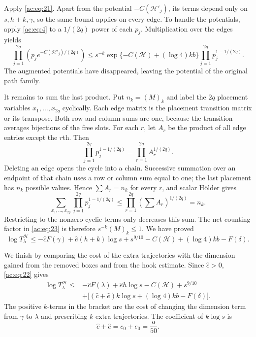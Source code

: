 Apply \eqref{ac:eq:21}. Apart from the potential
\(-C(\mathcal H'_j)\), its terms depend only on \(s,h+k,\gamma\), so the
same bound applies on every edge. To handle the potentials, apply
\eqref{ac:eq:4} to a \(1/(2q)\) power of each \(p_j\). Multiplication
over the edges yields
\[
 \prod_{j=1}^{2q}\left(p_j e^{-C(\mathcal H'_j)/(2q)}\right)
 \le s^{-k}\exp\{-C(\mathcal H)+(\log4)kb\}
       \prod_{j=1}^{2q}p_j^{1-1/(2q)}.
\]
The augmented potentials have disappeared, leaving the potential of the
original path family.

It remains to sum the last product. Put \(n_k=(M)_k\) and label the
\(2q\) placement variables \(x_1,\ldots,x_{2q}\) cyclically. Each edge
matrix is the placement transition matrix or its transpose. Both row
and column sums are one, because the transition averages bijections of
the free slots. For each \(r\), let \(A_r\) be the product of all edge
entries except the \(r\)th. Then
\[
 \prod_{j=1}^{2q}p_j^{1-1/(2q)}
 =\prod_{r=1}^{2q}A_r^{1/(2q)}.
\]
Deleting an edge opens the cycle into a chain. Successive summation over
an endpoint of that chain uses a row or column sum equal to one; the
last placement has \(n_k\) possible values. Hence \(\sum A_r=n_k\)
for every \(r\), and scalar H\"older gives
\[
 \sum_{x_1,\ldots,x_{2q}}\prod_{j=1}^{2q}p_j^{1-1/(2q)}
 \le\prod_{r=1}^{2q}\left(\sum A_r\right)^{1/(2q)}
 =n_k.
\]
Restricting to the nonzero cyclic terms only decreases this sum.
The net counting factor in \eqref{ac:eq:23} is therefore
\(s^{-k}(M)_k\le1\). We have proved
\begin{equation}
 \log T_\lambda^{\mathcal H}
 \le-\widehat c F(\gamma)+\widehat e(h+k)\log s+s^{9/10}
       -C(\mathcal H)+(\log4)kb-F(\delta).
 \label{ac:eq:24}
\end{equation}

We finish by comparing the cost of the extra trajectories with the
dimension gained from the removed boxes and from the hook estimate.
Since \(\widehat c>0\), \eqref{ac:eq:22} gives
\[
\begin{aligned}
 \log T_\lambda^{\mathcal H}
 \le{}&-\widehat c F(\lambda)+\widehat e h\log s
       -C(\mathcal H)+s^{9/10}\\
 &+\big[(\widehat c+\widehat e)k\log s
       +(\log4)kb-F(\delta)\big].
\end{aligned}
\]
The positive \(k\)-terms in the bracket are the cost of changing the
dimension term from \(\gamma\) to \(\lambda\) and prescribing \(k\)
extra trajectories. The coefficient of \(k\log s\) is
\[
 \widehat c+\widehat e=c_0+e_0=\frac a{50}.
\]


